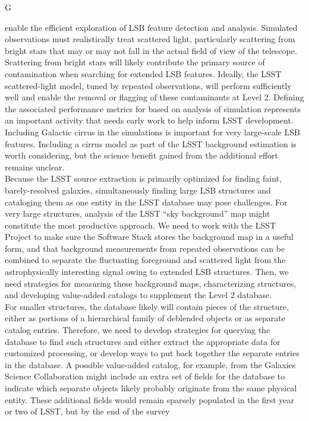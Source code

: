 {\begin{tasklist}{G}
\begin{task}
{enable the efficient exploration of LSB feature detection and analysis.
Simulated observations must realistically treat scattered light, particularly
scattering from bright stars that may or may not fall in the actual field of
view of the telescope. Scattering from bright stars will likely contribute the
primary source of contamination when searching for extended LSB features.
Ideally, the LSST scattered-light model,
tuned by repeated observations, will perform sufficiently well and enable the removal
or flagging of these contaminants at Level 2.  
Defining the associated performance metrics for
based on analysis of simulation represents an important activity that needs early work to 
help inform LSST development. Including Galactic cirrus in the simulations is important
for very large-scale LSB features. Including a cirrus model as part of the LSST background
estimation is worth considering, but the science benefit gained from the
additional effort remains unclear.\\
Because the LSST source extraction is primarily
optimized for finding faint, barely-resolved galaxies,
simultaneously finding large LSB structures and cataloging them as 
one entity in the LSST database may pose challenges. 
For very large structures, analysis of the LSST ``sky background''
map might constitute the most productive approach. 
We need to work with the LSST Project
to make sure the Software Stack stores the background map in a useful form, and that background
measurements from repeated observations can be combined to separate the fluctuating
foreground and scattered light from the astrophysically interesting signal owing to extended
LSB structures.
Then, we need strategies for measuring these background maps, characterizing
structures, and developing value-added catalogs to supplement the Level 2 database.\\
For smaller structures, the database likely will contain pieces 
of the structure, either as portions of a hierarchical
family of deblended objects or as separate catalog entries. Therefore, we need to 
develop strategies for querying the database to find such structures and either extract
the appropriate data for customized processing, or develop ways to put back together
the separate entries in the database. A possible value-added catalog, for example, from
the Galaxies Science Collaboration might include an extra set of fields for the database to indicate 
which separate objects likely probably originate from the same physical entity. These additional fields would
remain sparsely populated in the first year or two of LSST, but by the end of the survey 
}
\end{task}
\end{tasklist}}
